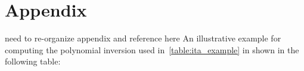 \documentclass[runningheads]{llncs}
\begin{document}

%
%
%
% 
% 
%

\newpage

\section*{Appendix}
%
{\color{red} need to re-organize appendix and reference here}
An illustrative example for computing the polynomial inversion used in~\ref{table:ita_example} in shown in the following table:
\end{document}
